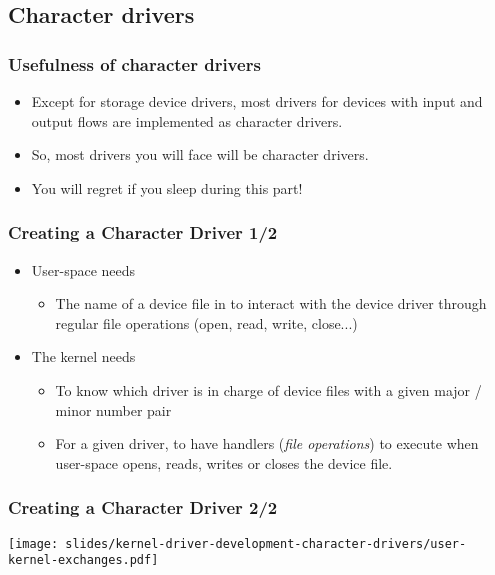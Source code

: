 \subsection{Character drivers}

\begin{frame}
  \frametitle{Usefulness of character drivers}
  \begin{itemize}
  \item Except for storage device drivers, most drivers for devices
    with input and output flows are implemented as character drivers.
  \item So, most drivers you will face will be character drivers.
  \item You will regret if you sleep during this part!
  \end{itemize}
\end{frame}

\begin{frame}
  \frametitle{Creating a Character Driver 1/2}
  \begin{itemize}
  \item User-space needs
    \begin{itemize}
    \item The name of a device file in  to interact with
      the device driver through regular file operations (open, read,
      write, close...)
    \end{itemize}
  \item The kernel needs
    \begin{itemize}
    \item To know which driver is in charge of device files with a
      given major / minor number pair
    \item For a given driver, to have handlers (\emph{file
        operations}) to execute when user-space opens, reads, writes
      or closes the device file.
    \end{itemize}
  \end{itemize}
\end{frame}


\begin{frame}
  \frametitle{Creating a Character Driver 2/2}
  \begin{center}
    \texttt{[image: slides/kernel-driver-development-character-drivers/user-kernel-exchanges.pdf]}
  \end{center}
\end{frame}

